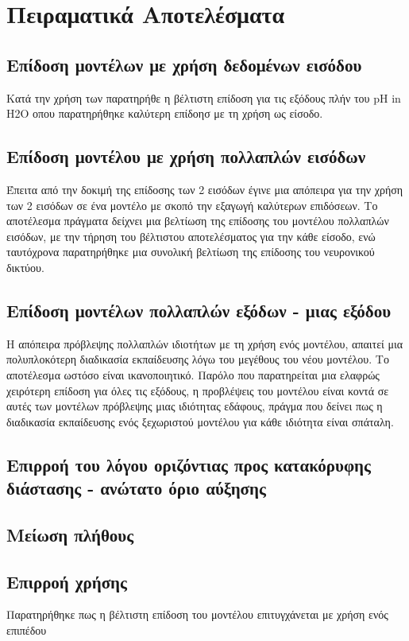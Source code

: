 \chapter{Πειραματικά Αποτελέσματα}
\label{ch:experiments_results}

\section{Επίδοση μοντέλων με χρήση δεδομένων εισόδου }
Κατά την χρήση των  παρατηρήθε η βέλτιστη επίδοση για τις εξόδους  πλήν του pH in H2O οπου παρατηρήθηκε καλύτερη επίδοησ με τη χρήση  ως είσοδο.

\section{Επίδοση μοντέλου με χρήση πολλαπλών εισόδων}
Έπειτα από την δοκιμή της επίδοσης των 2 εισόδων έγινε μια απόπειρα για την χρήση των 2 εισόδων σε ένα μοντέλο με σκοπό την εξαγωγή καλύτερων επιδόσεων. Το αποτέλεσμα πράγματα δείχνει μια βελτίωση της επίδοσης του μοντέλου πολλαπλών εισόδων, με την τήρηση του βέλτιστου αποτελέσματος για την κάθε είσοδο, ενώ ταυτόχρονα παρατηρήθηκε μια συνολική βελτίωση της επίδοσης του νευρονικού δικτύου.

\section{Επίδοση μοντέλων πολλαπλών εξόδων - μιας εξόδου}
Η απόπειρα πρόβλεψης πολλαπλών ιδιοτήτων με τη χρήση ενός μοντέλου, απαιτεί μια πολυπλοκότερη διαδικασία εκπαίδευσης λόγω του μεγέθους του νέου μοντέλου. Το αποτέλεσμα ωστόσο είναι ικανοποιητικό. Παρόλο που παρατηρείται μια ελαφρώς χειρότερη επίδοση για όλες τις εξόδους, η προβλέψεις του μοντέλου είναι κοντά σε αυτές των μοντέλων πρόβλεψης μιας ιδιότητας εδάφους, πράγμα που δείνει πως η διαδικασία εκπαίδευσης ενός ξεχωριστού μοντέλου για κάθε ιδιότητα είναι σπάταλη. 

\section{Επιρροή του λόγου οριζόντιας προς κατακόρυφης διάστασης - ανώτατο όριο αύξησης}


\section{Μείωση πλήθους }

\section{Επιρροή χρήσης }
Παρατηρήθηκε πως η βέλτιστη επίδοση του μοντέλου επιτυγχάνεται με χρήση ενός επιπέδου  